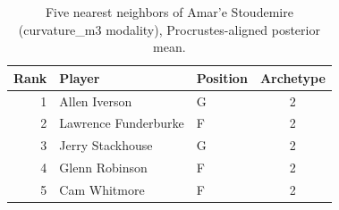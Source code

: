 \begin{table}[htbp]
  \centering\small
  \begin{tabular}{rllc}
    \toprule
    Rank & Player & Position & Archetype \\
    \midrule
    1 & Allen Iverson & G & 2 \\
    2 & Lawrence Funderburke & F & 2 \\
    3 & Jerry Stackhouse & G & 2 \\
    4 & Glenn Robinson & F & 2 \\
    5 & Cam Whitmore & F & 2 \\
    \bottomrule
  \end{tabular}
  \caption{Five nearest neighbors of Amar'e Stoudemire (curvature_m3 modality), Procrustes-aligned posterior mean.}
  \label{tab:Amar_e_Stoudemire_neighbors_curvature_m3}
\end{table}

